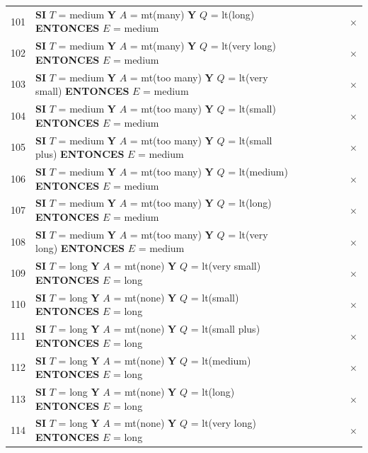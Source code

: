 {\begin{longtable}{@{}r l ccccc c@{}}
101 & \textbf{SI} $T$ = medium \textbf{Y} $A$ = mt(many) \textbf{Y} $Q$ = lt(long) \textbf{ENTONCES} $E$ = medium &  &  &  &  &  & $\times$ \\
102 & \textbf{SI} $T$ = medium \textbf{Y} $A$ = mt(many) \textbf{Y} $Q$ = lt(very long) \textbf{ENTONCES} $E$ = medium &  &  &  &  &  & $\times$ \\
103 & \textbf{SI} $T$ = medium \textbf{Y} $A$ = mt(too many) \textbf{Y} $Q$ = lt(very small) \textbf{ENTONCES} $E$ = medium &  &  &  &  &  & $\times$ \\
104 & \textbf{SI} $T$ = medium \textbf{Y} $A$ = mt(too many) \textbf{Y} $Q$ = lt(small) \textbf{ENTONCES} $E$ = medium &  &  &  &  &  & $\times$ \\
105 & \textbf{SI} $T$ = medium \textbf{Y} $A$ = mt(too many) \textbf{Y} $Q$ = lt(small plus) \textbf{ENTONCES} $E$ = medium &  &  &  &  &  & $\times$ \\
106 & \textbf{SI} $T$ = medium \textbf{Y} $A$ = mt(too many) \textbf{Y} $Q$ = lt(medium) \textbf{ENTONCES} $E$ = medium &  &  &  &  &  & $\times$ \\
107 & \textbf{SI} $T$ = medium \textbf{Y} $A$ = mt(too many) \textbf{Y} $Q$ = lt(long) \textbf{ENTONCES} $E$ = medium &  &  &  &  &  & $\times$ \\
108 & \textbf{SI} $T$ = medium \textbf{Y} $A$ = mt(too many) \textbf{Y} $Q$ = lt(very long) \textbf{ENTONCES} $E$ = medium &  &  &  &  &  & $\times$ \\
\midrule
109 & \textbf{SI} $T$ = long \textbf{Y} $A$ = mt(none) \textbf{Y} $Q$ = lt(very small) \textbf{ENTONCES} $E$ = long &  &  &  &  &  & $\times$ \\
110 & \textbf{SI} $T$ = long \textbf{Y} $A$ = mt(none) \textbf{Y} $Q$ = lt(small) \textbf{ENTONCES} $E$ = long &  &  &  &  &  & $\times$ \\
111 & \textbf{SI} $T$ = long \textbf{Y} $A$ = mt(none) \textbf{Y} $Q$ = lt(small plus) \textbf{ENTONCES} $E$ = long &  &  &  &  &  & $\times$ \\
112 & \textbf{SI} $T$ = long \textbf{Y} $A$ = mt(none) \textbf{Y} $Q$ = lt(medium) \textbf{ENTONCES} $E$ = long &  &  &  &  &  & $\times$ \\
113 & \textbf{SI} $T$ = long \textbf{Y} $A$ = mt(none) \textbf{Y} $Q$ = lt(long) \textbf{ENTONCES} $E$ = long &  &  &  &  &  & $\times$ \\
114 & \textbf{SI} $T$ = long \textbf{Y} $A$ = mt(none) \textbf{Y} $Q$ = lt(very long) \textbf{ENTONCES} $E$ = long &  &  &  &  &  & $\times$ \\

\end{longtable}}
